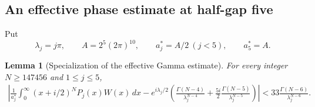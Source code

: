 \documentclass[11pt,a4paper]{article}
\newtheorem{lemma}[theorem]{Lemma}
\theoremstyle{definition}
\theoremstyle{remark}
\numberwithin{equation}{section}
\begin{document}
\subsection{An effective phase estimate at half-gap five}

Put
\[
 \lambda_j=j\pi,\qquad A=2^5(2\pi)^{10},\qquad
 a_j^*=A/2\ (j<5),\qquad a_5^*=A.
\]

\begin{lemma}[Specialization of the effective Gamma estimate]
\label{gt:phase}
For every integer $N\ge147456$ and $1\le j\le5$,
\begin{align}
 \left|\frac1{a_j^*}\int_0^\infty(x+i/2)^NP_j(x)W(x)\,dx
 -e^{i\lambda_j/2}\left(
 \frac{\Gamma(N-4)}{\lambda_j^{N-4}}
 +\frac{5i}{2}\frac{\Gamma(N-5)}{\lambda_j^{N-5}}
                         \right)\right|
 <33\frac{\Gamma(N-6)}{\lambda_j^{N-6}}.\label{gt:phase-bound}
\end{align}
\end{lemma}
\end{document}
